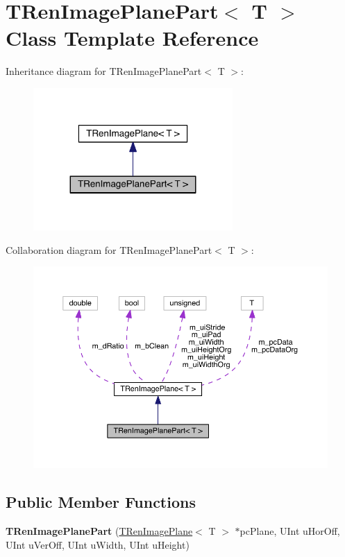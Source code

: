 \hypertarget{class_t_ren_image_plane_part}{}\section{T\+Ren\+Image\+Plane\+Part$<$ T $>$ Class Template Reference}
\label{class_t_ren_image_plane_part}


Inheritance diagram for T\+Ren\+Image\+Plane\+Part$<$ T $>$\+:
\nopagebreak
\begin{figure}[H]
\begin{center}
\leavevmode
\includegraphics[width=215pt]{d6/d80/class_t_ren_image_plane_part__inherit__graph}
\end{center}
\end{figure}


Collaboration diagram for T\+Ren\+Image\+Plane\+Part$<$ T $>$\+:
\nopagebreak
\begin{figure}[H]
\begin{center}
\leavevmode
\includegraphics[width=350pt]{dd/d41/class_t_ren_image_plane_part__coll__graph}
\end{center}
\end{figure}
\subsection*{Public Member Functions}
\begin{DoxyCompactItemize}
\item 
\mbox{\label{class_t_ren_image_plane_part_ac54352aebfe11c052c77661b377d9367}} 
{\bfseries T\+Ren\+Image\+Plane\+Part} (\hyperlink{class_t_ren_image_plane}{T\+Ren\+Image\+Plane}$<$ T $>$ $\ast$pc\+Plane, U\+Int u\+Hor\+Off, U\+Int u\+Ver\+Off, U\+Int u\+Width, U\+Int u\+Height)
\end{DoxyCompactItemize}
